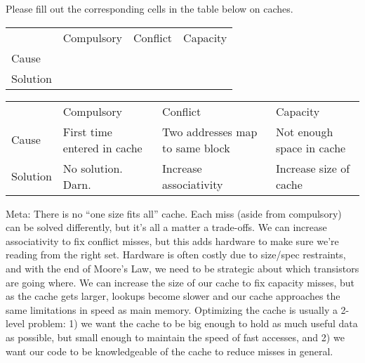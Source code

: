 \begin{blocksection}
\question
Please fill out the corresponding cells in the table below on caches.

\begin{table}[]
\begin{tabular}{llll}
 & Compulsory & Conflict & Capacity \\
Cause & & & \\
Solution & & &
\end{tabular}
\end{table}

\begin{solution}
\begin{table}[]
\begin{tabular}{llll}
 & Compulsory & Conflict & Capacity \\
Cause & First time entered in cache & Two addresses map to same block & Not enough space in cache \\
Solution & No solution. Darn. & Increase associativity & Increase size of cache
\end{tabular}
\end{table}

Meta: There is no “one size fits all” cache. Each miss (aside from compulsory) can be solved differently, but it’s all a matter a trade-offs. We can increase associativity to fix conflict misses, but this adds hardware to make sure we’re reading from the right set. Hardware is often costly due to size/spec restraints, and with the end of Moore’s Law, we need to be strategic about which transistors are going where. We can increase the size of our cache to fix capacity misses, but as the cache gets larger, lookups become slower and our cache approaches the same limitations in speed as main memory. Optimizing the cache is usually a 2-level problem: 1) we want the cache to be big enough to hold as much useful data as possible, but small enough to maintain the speed of fast accesses, and 2) we want our code to be knowledgeable of the cache to reduce misses in general.

\end{solution}

\end{blocksection}